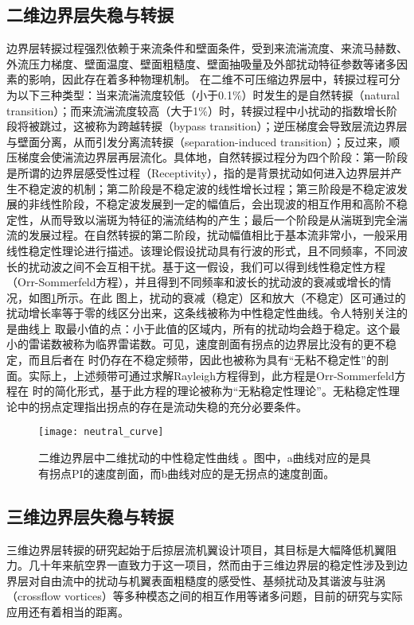 \subsection{二维边界层失稳与转捩}
边界层转捩过程强烈依赖于来流条件和壁面条件，受到来流湍流度、来流马赫数、外流压力梯度、壁面温度、壁面粗糙度、壁面抽吸量及外部扰动特征参数等诸多因素的影响\cite{morkovin1969many}，因此存在着多种物理机制。
在二维不可压缩边界层中，转捩过程可分为以下三种类型：当来流湍流度较低（小于0.1\%）时发生的是自然转捩（natural transition）\cite{papanastasiou1999viscous}；而来流湍流度较高（大于1\%）时，转捩过程中小扰动的指数增长阶段将被跳过，这被称为跨越转捩（bypass transition）\cite{jacobs2001simulations}；逆压梯度会导致层流边界层与壁面分离，从而引发分离流转捩（separation-induced transition）\cite{malkiel1995transition}；反过来，顺压梯度会使湍流边界层再层流化\cite{walker1992role}。具体地，自然转捩过程分为四个阶段\cite{bradshaw1994turbulence}：第一阶段是所谓的边界层感受性过程（Receptivity）\cite{reshotko1984environment}，指的是背景扰动如何进入边界层并产生不稳定波的机制；第二阶段是不稳定波的线性增长过程；第三阶段是不稳定波发展的非线性阶段，不稳定波发展到一定的幅值后，会出现波的相互作用和高阶不稳定性，从而导致以湍斑为特征的湍流结构的产生；最后一个阶段是从湍斑到完全湍流的发展过程。在自然转捩的第二阶段，扰动幅值相比于基本流非常小，一般采用线性稳定性理论进行描述。该理论假设扰动具有行波的形式，且不同频率，不同波长的扰动波之间不会互相干扰。基于这一假设，我们可以得到线性稳定性方程（Orr-Sommerfeld方程），并且得到不同频率和波长的扰动波的衰减或增长的情况，如图\ref{f:neutral_curve}所示。在此 图上，扰动的衰减（稳定）区和放大（不稳定）区可通过的扰动增长率等于零的线区分出来，这条线被称为中性稳定性曲线。令人特别关注的是曲线上 取最小值的点：小于此值的区域内，所有的扰动均会趋于稳定。这个最小的雷诺数被称为临界雷诺数。可见，速度剖面有拐点的边界层比没有的更不稳定，而且后者在 时仍存在不稳定频带，因此也被称为具有“无粘不稳定性”的剖面。实际上，上述频带可通过求解Rayleigh方程\cite{Schlichting1979}得到，此方程是Orr-Sommerfeld方程在 时的简化形式，基于此方程的理论被称为“无粘稳定性理论”。无粘稳定性理论中的拐点定理指出拐点的存在是流动失稳的充分必要条件。
\begin{figure}
  \centering
  \texttt{[image: neutral\_curve]}
  \caption{二维边界层中二维扰动的中性稳定性曲线\cite{Schlichting1979}
  。图中，a曲线对应的是具有拐点PI的速度剖面，而b曲线对应的是无拐点的速度剖面。}\label{f:neutral_curve}
\end{figure}

\subsection{三维边界层失稳与转捩}
三维边界层转捩的研究起始于后掠层流机翼设计项目\cite{Gray1952}，其目标是大幅降低机翼阻力。几十年来航空界一直致力于这一项目，然而由于三维边界层的稳定性涉及到边界层对自由流中的扰动与机翼表面粗糙度的感受性、基频扰动及其谐波与驻涡（crossflow vortices）等多种模态之间的相互作用等诸多问题，目前的研究与实际应用还有着相当的距离。

